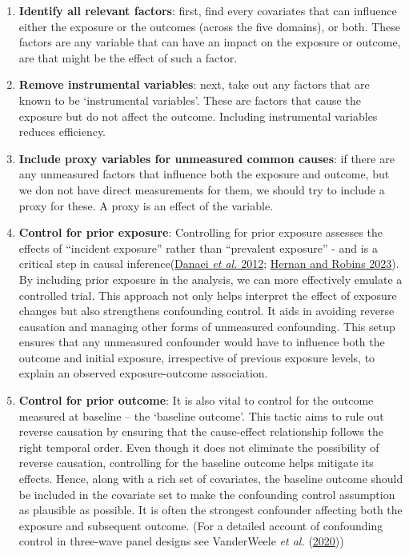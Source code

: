 \documentclass[
  singlecolumn,
  9pt]{article}
\begin{document}
\begin{enumerate}
\def\labelenumi{\arabic{enumi}.}
\item
  \textbf{Identify all relevant factors}: first, find every covariates
  that can influence either the exposure or the outcomes (across the
  five domains), or both. These factors are any variable that can have
  an impact on the exposure or outcome, are that might be the effect of
  such a factor.
\item
  \textbf{Remove instrumental variables}: next, take out any factors
  that are known to be `instrumental variables'. These are factors that
  cause the exposure but do not affect the outcome. Including
  instrumental variables reduces efficiency.
\item
  \textbf{Include proxy variables for unmeasured common causes}: if
  there are any unmeasured factors that influence both the exposure and
  outcome, but we don not have direct measurements for them, we should
  try to include a proxy for these. A proxy is an effect of the
  variable.
\item
  \textbf{Control for prior exposure}: Controlling for prior exposure
  assesses the effects of ``incident exposure'' rather than ``prevalent
  exposure'' - and is a critical step in causal
  inference(\hyperref[ref-danaei2012]{Danaei \emph{et al.} 2012};
  \hyperref[ref-hernan2023]{Hernan and Robins 2023}). By including prior
  exposure in the analysis, we can more effectively emulate a controlled
  trial. This approach not only helps interpret the effect of exposure
  changes but also strengthens confounding control. It aids in avoiding
  reverse causation and managing other forms of unmeasured confounding.
  This setup ensures that any unmeasured confounder would have to
  influence both the outcome and initial exposure, irrespective of
  previous exposure levels, to explain an observed exposure-outcome
  association.
\item
  \textbf{Control for prior outcome}: It is also vital to control for
  the outcome measured at baseline -- the `baseline outcome'. This
  tactic aims to rule out reverse causation by ensuring that the
  cause-effect relationship follows the right temporal order. Even
  though it does not eliminate the possibility of reverse causation,
  controlling for the baseline outcome helps mitigate its effects.
  Hence, along with a rich set of covariates, the baseline outcome
  should be included in the covariate set to make the confounding
  control assumption as plausible as possible. It is often the strongest
  confounder affecting both the exposure and subsequent outcome. (For a
  detailed account of confounding control in three-wave panel designs
  see VanderWeele \emph{et al.} (\hyperref[ref-vanderweele2020]{2020}))
\end{enumerate}
\end{document}
